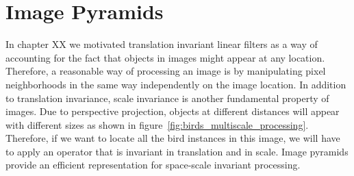 \chapter{Image Pyramids}\label{chapter:image_pyramids}


%


%



In chapter XX we motivated translation invariant linear filters as a way of accounting for the fact that objects in images might appear at any location. Therefore, a reasonable way of processing an image is by manipulating pixel neighborhoods  in the same way independently on the image location. In addition to translation invariance, scale invariance is another fundamental property of images. Due to perspective projection, objects at different distances will appear with different sizes as shown in figure~\ref{fig:birds_multiscale_processing}. Therefore, if we want to locate all the bird instances in this image, we will have to apply an operator that is invariant in translation and in scale. Image pyramids provide an efficient representation for space-scale invariant processing.

